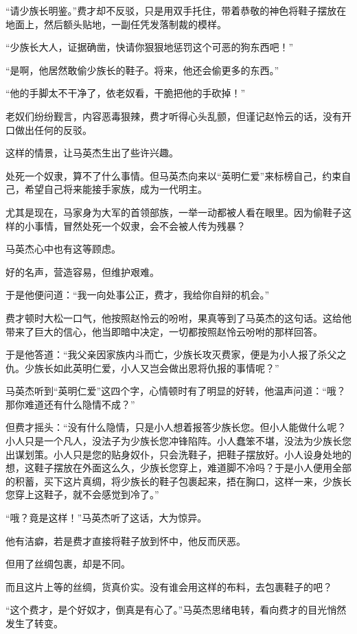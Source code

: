 \begin{this_body}
“请少族长明鉴。”费才却不反驳，只是用双手托住，带着恭敬的神色将鞋子摆放在地面上，然后额头贴地，一副任凭发落制裁的模样。

“少族长大人，证据确凿，快请你狠狠地惩罚这个可恶的狗东西吧！”

“是啊，他居然敢偷少族长的鞋子。将来，他还会偷更多的东西。”

“他的手脚太不干净了，依老奴看，干脆把他的手砍掉！”

老奴们纷纷觐言，内容恶毒狠辣，费才听得心头乱颤，但谨记赵怜云的话，没有开口做出任何的反驳。

这样的情景，让马英杰生出了些许兴趣。

处死一个奴隶，算不了什么事情。但马英杰向来以“英明仁爱”来标榜自己，约束自己，希望自己将来能接手家族，成为一代明主。

尤其是现在，马家身为大军的首领部族，一举一动都被人看在眼里。因为偷鞋子这样的小事情，冒然处死一个奴隶，会不会被人传为残暴？

马英杰心中也有这等顾虑。

好的名声，营造容易，但维护艰难。

于是他便问道：“我一向处事公正，费才，我给你自辩的机会。”

费才顿时大松一口气，他按照赵怜云的吩咐，果真等到了马英杰的这句话。这给他带来了巨大的信心，他当即暗中决定，一切都按照赵怜云吩咐的那样回答。

于是他答道：“我父亲因家族内斗而亡，少族长攻灭费家，便是为小人报了杀父之仇。少族长如此英明仁爱，小人又岂会做出恩将仇报的事情呢？”

马英杰听到“英明仁爱”这四个字，心情顿时有了明显的好转，他温声问道：“哦？那你难道还有什么隐情不成？”

但费才摇头：“没有什么隐情，只是小人想着报答少族长您。但小人能做什么呢？小人只是一个凡人，没法子为少族长您冲锋陷阵。小人蠢笨不堪，没法为少族长您出谋划策。小人只是您的贴身奴仆，只会洗鞋子，把鞋子摆放好。小人设身处地的想，这鞋子摆放在外面这么久，少族长您穿上，难道脚不冷吗？于是小人便用全部的积蓄，买下这片真绸，将少族长的鞋子包裹起来，捂在胸口，这样一来，少族长您穿上这鞋子，就不会感觉到冷了。”

“哦？竟是这样！”马英杰听了这话，大为惊异。

他有洁癖，若是费才直接将鞋子放到怀中，他反而厌恶。

但用了丝绸包裹，却是不同。

而且这片上等的丝绸，货真价实。没有谁会用这样的布料，去包裹鞋子的吧？

“这个费才，是个好奴才，倒真是有心了。”马英杰思绪电转，看向费才的目光悄然发生了转变。


\end{this_body}
